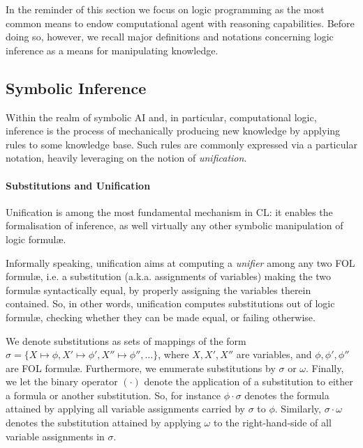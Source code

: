 \documentclass[12pt,a4paper,openright,twoside]{book}
\begin{document}
In the reminder of this section we focus on logic programming as the most common means to endow computational agent with reasoning capabilities.
%
Before doing so, however, we recall major definitions and notations concerning logic inference as a means for manipulating knowledge.

\subsection{Symbolic Inference} %

Within the realm of symbolic AI and, in particular, computational logic, inference is the process of mechanically producing new knowledge by applying rules to some knowledge base.
%
Such rules are commonly expressed via a particular notation, heavily leveraging on the notion of \emph{unification}.

\paragraph{Substitutions and Unification}

Unification \cite{MartelliMontanari1982} is among the most fundamental mechanism in CL: it enables the formalisation of inference, as well virtually any other symbolic manipulation of logic formul\ae{}.

Informally speaking, unification aims at computing a \emph{unifier} among any two FOL formul\ae{}, i.e. a substitution (a.k.a. assignments of variables) making the two formul\ae{} syntactically equal, by properly assigning the variables therein contained.
%
So, in other words, unification computes substitutions out of logic formul\ae{}, checking whether they can be made equal, or failing otherwise.

We denote substitutions as sets of mappings of the form $\sigma = \{ X \mapsto \phi, X' \mapsto \phi', X'' \mapsto \phi'', \ldots \}$, where $X, X', X''$ are variables, and $\phi, \phi', \phi''$ are FOL formul\ae{}.
%
Furthermore, we enumerate substitutions by $\sigma$ or $\omega$.
%
Finally, we let the binary operator $(\cdot)$ denote the application of a substitution to either a formula or another substitution.
%
So, for instance $\phi \cdot \sigma$ denotes the formula attained by applying all variable assignments carried by $\sigma$ to $\phi$.
%
Similarly, $\sigma \cdot \omega$ denotes the substitution attained by applying $\omega$ to the right-hand-side of all variable assignments in $\sigma$.
\end{document}
